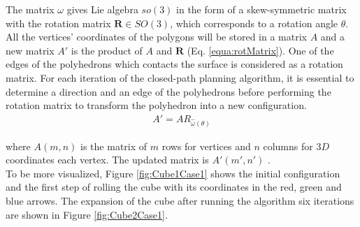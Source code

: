 \noindent The matrix $\omega$ gives Lie algebra $so(3)$ in the form of a skew-symmetric matrix with the rotation matrix $\textbf{R}\in SO(3)$, which corresponds to a rotation angle $\theta$.
All the vertices' coordinates of the polygons will be stored in a matrix $A$ and a new matrix $A'$ is the product of $A$ and $\textbf{R}$ (Eq. \ref{equa:rotMatrix}). 
One of the edges of the polyhedrons which contacts the surface is considered as a rotation matrix.
For each iteration of the closed-path planning algorithm, it is essential to determine a direction and an edge of the polyhedrons before performing the rotation matrix to transform the polyhedron into a new configuration.
%
\begin{equation}
\begin{split}
A' = AR_{\hat{\omega}(\theta)}
\end{split}	
\label{equa:rotMatrix}
\end{equation}

where $A(m,n)$ is the matrix of $m$ rows for vertices and $n$ columns for $3D$ coordinates each vertex. The updated matrix is $A'(m',n')$ .\\

%
%
\noindent To be more visualized, Figure \ref{fig:Cube1Case1} shows the initial configuration and the first step of rolling the cube with its coordinates in the red, green and blue arrows. 
The expansion of the cube after running the algorithm six iterations are shown in Figure \ref{fig:Cube2Case1}. 

